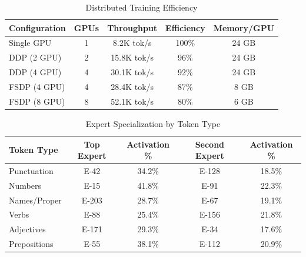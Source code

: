 
\begin{table}[htbp]
\centering
\caption{Distributed Training Efficiency}
\label{tab:distributed-efficiency}
\begin{tabular}{@{}lcccc@{}}
\toprule
\textbf{Configuration} & \textbf{GPUs} & \textbf{Throughput} & \textbf{Efficiency} & \textbf{Memory/GPU} \\
\midrule
Single GPU & 1 & 8.2K tok/s & 100\% & 24 GB \\
DDP (2 GPU) & 2 & 15.8K tok/s & 96\% & 24 GB \\
DDP (4 GPU) & 4 & 30.1K tok/s & 92\% & 24 GB \\
FSDP (4 GPU) & 4 & 28.4K tok/s & 87\% & 8 GB \\
FSDP (8 GPU) & 8 & 52.1K tok/s & 80\% & 6 GB \\
\bottomrule
\end{tabular}
\end{table}


\begin{table}[htbp]
\centering
\caption{Expert Specialization by Token Type}
\label{tab:expert-specialization}
\begin{tabular}{@{}lcccc@{}}
\toprule
\textbf{Token Type} & \textbf{Top Expert} & \textbf{Activation \%} & \textbf{Second Expert} & \textbf{Activation \%} \\
\midrule
Punctuation & E-42 & 34.2\% & E-128 & 18.5\% \\
Numbers & E-15 & 41.8\% & E-91 & 22.3\% \\
Names/Proper & E-203 & 28.7\% & E-67 & 19.1\% \\
Verbs & E-88 & 25.4\% & E-156 & 21.8\% \\
Adjectives & E-171 & 29.3\% & E-34 & 17.6\% \\
Prepositions & E-55 & 38.1\% & E-112 & 20.9\% \\
\bottomrule
\end{tabular}
\end{table}


